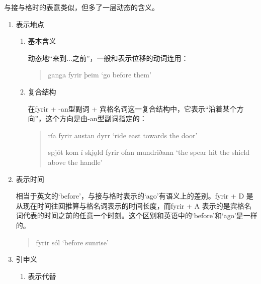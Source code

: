\begin{enumerate}[itemindent=1em, label=\textbf{\arabic*}.]
\begin{enumerate}
                    与接与格时的表意类似，但多了一层动态的含义。
                    \begin{enumerate}
                        \item 表示地点

                              \begin{enumerate}
                                  \item 基本含义

                                        动态地“来到...之前”，一般和表示位移的动词连用：
                                        \begin{quote}
                                            ganga fyrir þeim `go before them'
                                        \end{quote}

                                  \item 复合结构

                                        在fyrir + -an型副词 + 宾格名词这一复合结构中，它表示“沿着某个方向”，这个方向是由-an型副词指定的：
                                        \begin{quote}
                                            r\'{i}\dh a fyrir austan dyrr `ride east towards the door'

                                            spjót kom í skj\k{o}ld fyrir ofan mundriðann `the spear hit the shield above the handle'
                                        \end{quote}

                              \end{enumerate}

                        \item 表示时间

                              相当于英文的`before'，与接与格时表示的`ago'有语义上的差别。fyrir + D 是从现在时间往回推算与格名词表示的时间长度，而fyrir + A 表示的是宾格名词代表的时间之前的任意一个时刻。这个区别和英语中的`before'和`ago'是一样的。
                              \begin{quote}
                                  fyrir sól `before sunrise'
                              \end{quote}

                        \item 引申义
                              \begin{enumerate}
                                  \item 表示代替


\end{enumerate}
\end{enumerate}
\end{enumerate}
\end{enumerate}

